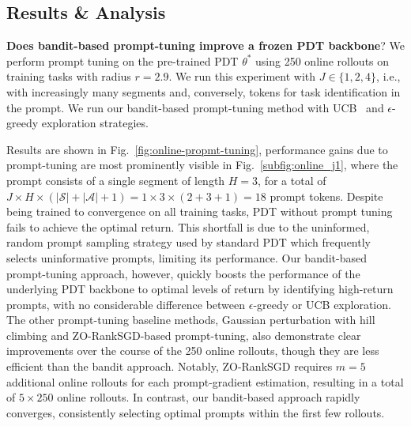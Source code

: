 \documentclass{article}
\begin{document}
\subsection{Results \& Analysis}\label{sec:results}
\textbf{Does bandit-based prompt-tuning improve a frozen PDT backbone}?
We perform prompt tuning on the pre-trained PDT $\theta^*$ using 250 online rollouts on training tasks with radius $r=2.9$. We run this experiment with $J \in \{ 1, 2, 4\}$, i.e., with increasingly many segments and, conversely, tokens for task identification in the prompt. We run our bandit-based prompt-tuning method with UCB~\citep{li2010contextual} and $\epsilon$-greedy exploration strategies.

Results are shown in Fig.~\ref{fig:online-propmt-tuning}, performance gains due to prompt-tuning are most prominently visible in Fig.~\ref{subfig:online_j1}, where the prompt consists of a single segment of length $H=3$, for a total of $J\times H \times (|\mathcal{S}| + |\mathcal{A}| + 1) = 1 \times 3 \times (2 + 3 + 1) = 18$ prompt tokens.
Despite being trained to convergence on all training tasks, PDT without prompt tuning fails to achieve the optimal return. This shortfall is due to the uninformed, random prompt sampling strategy used by standard PDT which frequently selects uninformative prompts, limiting its performance.
Our bandit-based prompt-tuning approach, however, quickly boosts the performance of the underlying PDT backbone to optimal levels of return by identifying high-return prompts, with no considerable difference between $\epsilon$-greedy or UCB exploration.
The other prompt-tuning baseline methods, Gaussian perturbation with hill climbing and ZO-RankSGD-based prompt-tuning, also demonstrate clear improvements over the course of the 250 online rollouts, though they are less efficient than the bandit approach. Notably, ZO-RankSGD requires $m=5$ additional online rollouts for each prompt-gradient estimation, resulting in a total of $5 \times 250 $ online rollouts. In contrast, our bandit-based approach rapidly converges,  consistently selecting optimal prompts within the first few rollouts. 
\end{document}
